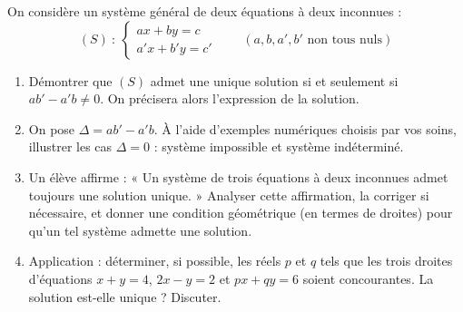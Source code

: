 \documentclass[11pt]{article}
\begin{document}
\begin{exercice}
On considère un système général de deux équations à deux inconnues :
\[
(S)\ :\ 
\begin{cases}
ax + by = c \\
a'x + b'y = c'
\end{cases}
\qquad (a,b,a',b' \text{ non tous nuls})
\]

\begin{enumerate}
\item Démontrer que $(S)$ admet une unique solution si et seulement si $ab' - a'b \neq 0$. On précisera alors l'expression de la solution.
\item On pose $\Delta = ab' - a'b$. À l'aide d'exemples numériques choisis par vos soins, illustrer les cas $\Delta = 0$ : système impossible et système indéterminé.
\item Un élève affirme : « Un système de trois équations à deux inconnues admet toujours une solution unique. » Analyser cette affirmation, la corriger si nécessaire, et donner une condition géométrique (en termes de droites) pour qu'un tel système admette une solution.
\item Application : déterminer, si possible, les réels $p$ et $q$ tels que les trois droites d'équations $x + y = 4$, $2x - y = 2$ et $px + qy = 6$ soient concourantes. La solution est-elle unique ? Discuter.
\end{enumerate}
\end{exercice}
\end{document}
